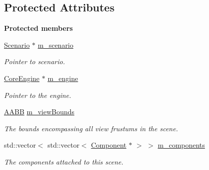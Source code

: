 \subsection*{Protected Attributes}
\begin{Indent}\textbf{ Protected members}\par
\begin{DoxyCompactItemize}
\item 
\mbox{\hyperlink{classrev_1_1_scenario}{Scenario}} $\ast$ \mbox{\hyperlink{classrev_1_1_scene_a4dedf53fbaa9c912c39a89de89cdc628}{m\+\_\+scenario}}
\begin{DoxyCompactList}\small\item\em Pointer to scenario. \end{DoxyCompactList}\item 
\mbox{\label{classrev_1_1_scene_aa4f69d3d9fe082f610af8d9f8b733b53}} 
\mbox{\hyperlink{classrev_1_1_core_engine}{Core\+Engine}} $\ast$ \mbox{\hyperlink{classrev_1_1_scene_aa4f69d3d9fe082f610af8d9f8b733b53}{m\+\_\+engine}}
\begin{DoxyCompactList}\small\item\em Pointer to the engine. \end{DoxyCompactList}\item 
\mbox{\label{classrev_1_1_scene_adad8ff5af185afe5f242b4f482506585}} 
\mbox{\hyperlink{classrev_1_1_a_a_b_b}{A\+A\+BB}} \mbox{\hyperlink{classrev_1_1_scene_adad8ff5af185afe5f242b4f482506585}{m\+\_\+view\+Bounds}}
\begin{DoxyCompactList}\small\item\em The bounds encompassing all view frustums in the scene. \end{DoxyCompactList}\item 
\mbox{\label{classrev_1_1_scene_a9b01518155723d2b5c712de4f94f32d2}} 
std\+::vector$<$ std\+::vector$<$ \mbox{\hyperlink{classrev_1_1_component}{Component}} $\ast$ $>$ $>$ \mbox{\hyperlink{classrev_1_1_scene_a9b01518155723d2b5c712de4f94f32d2}{m\+\_\+components}}
\begin{DoxyCompactList}\small\item\em The components attached to this scene. \end{DoxyCompactList}\item 
\mbox{\label{classrev_1_1_scene_aa224ac3c09a8ceb03d9fa7f6ca3540de}} 

\end{DoxyCompactItemize}
\end{Indent}
